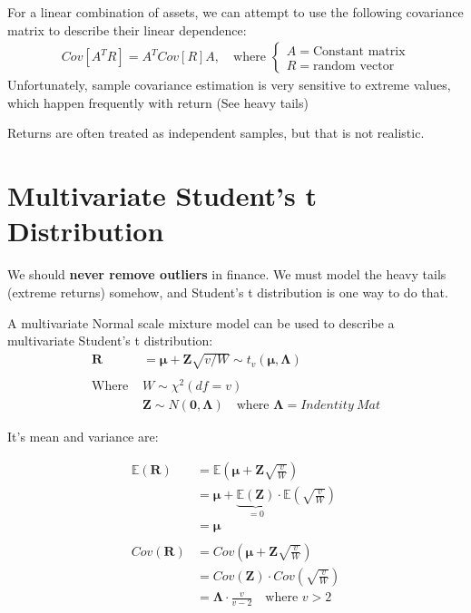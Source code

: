 \documentclass[
  oneside]{book}
\begin{document}
For a linear combination of assets, we can attempt to use the following covariance matrix to describe their linear dependence:
\[
\begin{aligned}
Cov[A^{T}R] = A^{T}Cov[R]A, \quad \text{where }\begin{cases}
A = \text{Constant matrix} \\
R = \text{random vector}
\end{cases}
\end{aligned}
\]
Unfortunately, sample covariance estimation is very sensitive to extreme values, which happen frequently with return (See heavy tails)

Returns are often treated as independent samples, but that is not realistic.

\hypertarget{multivariate-students-t-distribution}{%
\section{Multivariate Student's t Distribution}\label{multivariate-students-t-distribution}}

We should \textbf{never remove outliers} in finance. We must model the heavy tails (extreme returns) somehow, and Student's t distribution is one way to do that.

A multivariate Normal scale mixture model can be used to describe a multivariate Student's t distribution:
\[
\begin{aligned}
\mathbf{R} &= \boldsymbol{\mu} + \mathbf{Z} \sqrt{ v/W } \sim t_{v}(\boldsymbol{\mu}, \boldsymbol{\Lambda})\\
\\
\text{Where } & W \sim \chi^{2}(df=v)\\
& \mathbf{Z} \sim N(\mathbf{0}, \boldsymbol{\Lambda}) \quad \text{where } \boldsymbol{\Lambda} = Indentity \ Mat
\end{aligned}
\]

It's mean and variance are:

\[
\begin{aligned}
\mathbb{E}(\mathbf{R}) &= \mathbb{E}\left( \boldsymbol{\mu}+\mathbf{Z}\sqrt{ \frac{v}{W} }\right)\\ 
&= \boldsymbol{\mu} + \underbrace{ \mathbb{E}(\mathbf{Z}) }_{ =0 }\cdot \mathbb{E}\left( \sqrt{ \frac{v}{W} } \right)\\
&=\boldsymbol{\mu}\\
\\
Cov(\mathbf{R}) &= Cov\left( \boldsymbol{\mu} + \mathbf{Z} \sqrt{ \frac{v}{W} } \right)\\
&= Cov(\mathbf{Z}) \cdot Cov\left( \sqrt{ \frac{v}{W} } \right)\\
&= \boldsymbol{\Lambda}\cdot \frac{v}{v-2} \quad \text{where } v > 2
\end{aligned}
\]
\end{document}

